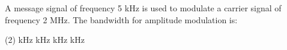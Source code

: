 \item A message signal of frequency 5 kHz is used to modulate a carrier signal of frequency 2 MHz. The bandwidth for amplitude modulation is:
    \begin{tasks}(2)
         kHz
         kHz
         kHz
         kHz
    \end{tasks}
